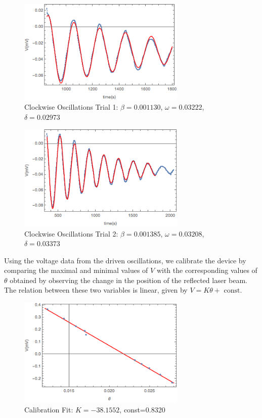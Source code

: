 \documentclass[aps, reprint,amsmath,amssymb]{revtex4-1} %
\begin{document}
\begin{figure}[h!]
\centering
\caption{Clockwise Oscillations Trial 1: $\beta = 0.001130$, $\omega = 0.03222$, $\delta=0.02973$}
\includegraphics[width=8cm]{figs/clockwise1plot.png}
\end{figure}

\begin{figure}[h!]
\centering
\caption{Clockwise Oscillations Trial 2: $\beta = 0.001385$, $\omega = 0.03208$, $\delta=0.03373$}
\includegraphics[width=8cm]{figs/clockwise2plot.png}
\end{figure}

Using the voltage data from the driven oscillations, we calibrate the device by comparing the maximal and minimal values of $V$ with the corresponding values of $\theta$ obtained by observing the change in the position of the reflected laser beam. The relation between these two variables is linear, given by $V = K \theta + \text{ const}$.

\begin{figure}[h!]
\centering
\caption{Calibration Fit: $K=-38.1552$, const=0.8320}
\includegraphics[width=8cm]{figs/calibration.png}
\end{figure} 
\end{document}
